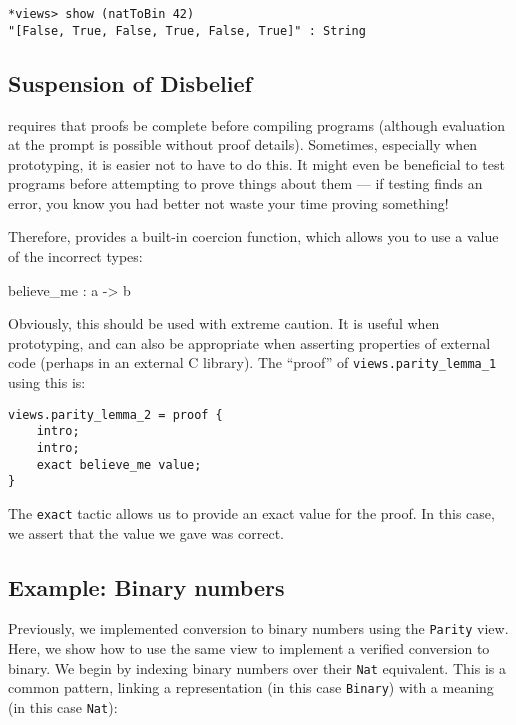 \begin{lstlisting}[style=stdout]
*views> show (natToBin 42)
"[False, True, False, True, False, True]" : String
\end{lstlisting}


\subsection{Suspension of Disbelief}

\Idris{} requires that proofs be complete before compiling programs (although evaluation at the prompt is possible without proof details). 
Sometimes, especially when prototyping, it is easier not to have to do this.
It might even be beneficial to test programs before attempting to prove things about them --- if testing finds an error, you know you had better not waste your time proving something!

Therefore, \Idris{} provides a built-in coercion function, which allows you to use a value of the incorrect types:

\begin{code}
believe_me : a -> b 
\end{code}

\noindent
Obviously, this should be used with extreme caution.
It is useful when prototyping, and can also be appropriate when asserting properties of external code (perhaps in an external C library). The ``proof'' of \texttt{views.parity\_lemma\_1} using this is:

\begin{lstlisting}[style=stdout]
views.parity_lemma_2 = proof {
    intro;
    intro;
    exact believe_me value;
}
\end{lstlisting}

\noindent
The \texttt{exact} tactic allows us to provide an exact value for the proof.
In this case, we assert that the value we gave was correct.

\subsection{Example: Binary numbers}

Previously, we implemented conversion to binary numbers using the \texttt{Parity} view.
Here, we show how to use the same view to implement a verified conversion to binary.
We begin by indexing binary numbers over their \texttt{Nat} equivalent.
This is a common pattern, linking a representation (in this case \texttt{Binary}) with a meaning (in this case \texttt{Nat}):

